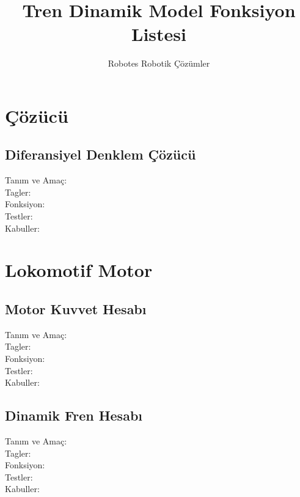 \documentclass[10pt,a4paper]{article}
\author{Robotes Robotik Çözümler}
\title{Tren Dinamik Model Fonksiyon Listesi}
\begin{document}
\maketitle
\newpage

\tableofcontents
\newpage

\section{Çözücü}

\subsection{Diferansiyel Denklem Çözücü}

\begin{description}
\item[Tanım ve Amaç:] 
\item[Tagler:]
\item[Fonksiyon:]
\item[Testler:]
\item[Kabuller:]
\end{description}

\newpage

\section{Lokomotif Motor}

\subsection{Motor Kuvvet Hesabı}
\begin{description}
\item[Tanım ve Amaç:] 
\item[Tagler:]
\item[Fonksiyon:]
\item[Testler:]
\item[Kabuller:]
\end{description}
\newpage

\subsection{Dinamik Fren Hesabı}
\begin{description}
\item[Tanım ve Amaç:] 
\item[Tagler:]
\item[Fonksiyon:]
\item[Testler:]
\item[Kabuller:]
\end{description}
\newpage
\end{document}
